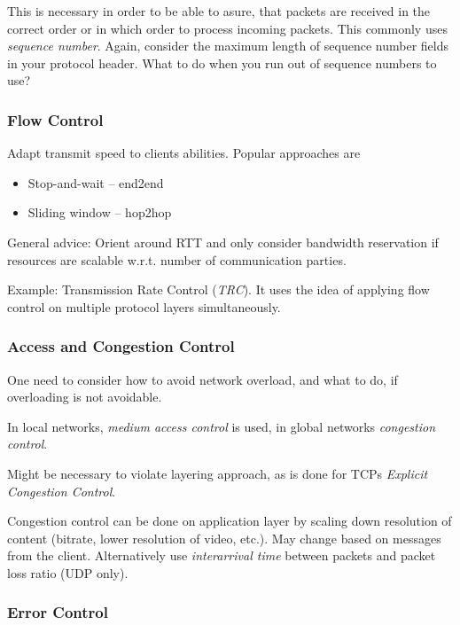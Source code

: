 \documentclass[english]{panikzettel}
\begin{document}
	This is necessary in order to be able to asure, that packets are received in the correct order or in which order to process incoming packets.
	This commonly uses \textit{sequence number}.
	Again, consider the maximum length of sequence number fields in your protocol header.
	What to do when you run out of sequence numbers to use?

	\subsubsection{Flow Control}
	\label{sssec-flow-control}
	
	Adapt transmit speed to clients abilities.
	Popular approaches are 
	\begin{itemize}
		\item Stop-and-wait – end2end
		\item Sliding window – hop2hop
	\end{itemize}

	General advice: Orient around RTT and only consider bandwidth reservation if resources are scalable w.r.t. number of communication parties.

	Example: Transmission Rate Control (\textit{TRC}).
	It uses the idea of applying flow control on multiple protocol layers simultaneously.

	\subsubsection{Access and Congestion Control}
	\label{sssec-access-and-congestion-control}
	
	One need to consider how to avoid network overload, and what to do, if overloading is not avoidable.

	In local networks, \textit{medium access control} is used, in global networks \textit{congestion control}.

	Might be necessary to violate layering approach, as is done for TCPs \textit{Explicit Congestion Control}.

	Congestion control can be done on application layer by scaling down resolution of content (bitrate, lower resolution of video, etc.).
	May change based on messages from the client. 
	Alternatively use \textit{interarrival time} between packets and packet loss ratio (UDP only).

	\subsubsection{Error Control}
	\label{sss-error-control}
	
\end{document}
